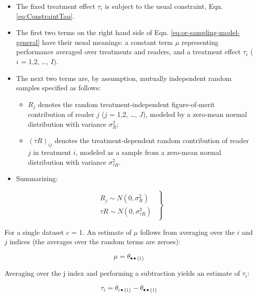 \documentclass[
]{book}
\providecommand{\tightlist}{%
  \setlength{\itemsep}{0pt}\setlength{\parskip}{0pt}}
\begin{document}
\begin{itemize}
\item
  The fixed treatment effect \(\tau_i\) is subject to the usual constraint, Eqn. \eqref{eq:ConstraintTau}.
\item
  The first two terms on the right hand side of Eqn. \eqref{eq:or-sampling-model-general} have their usual meanings: a constant term \(\mu\) representing performance averaged over treatments and readers, and a treatment effect \(\tau_i\) (\(i\) = 1,2, \ldots, \(I\)).
\item
  The next two terms are, by assumption, mutually independent random samples specified as follows:

  \begin{itemize}
  \tightlist
  \item
    \(R_j\) denotes the random treatment-independent figure-of-merit contribution of reader \(j\) (\(j\) = 1,2, \ldots, \(J\)), modeled by a zero-mean normal distribution with variance \(\sigma_R^2\);
  \item
    \((\tau R)_{ij}\) denotes the treatment-dependent random contribution of reader \(j\) in treatment \(i\), modeled as a sample from a zero-mean normal distribution with variance \(\sigma_{\tau R}^2\).
  \end{itemize}
\item
  Summarizing:
\end{itemize}

\begin{equation}
\left.
\begin{aligned}
\begin{matrix}
R_j \sim N(0,\sigma_R^2)\\ 
{\tau R} \sim N(0,\sigma_{\tau R}^2)
\end{matrix}
\end{aligned}
\right \}
\label{eq:ORVariances}
\end{equation}

For a single dataset \(c\) = 1. An estimate of \(\mu\) follows from averaging over the \(i\) and \(j\) indices (the averages over the random terms are zeroes):

\begin{equation}
\mu = \theta_{\bullet \bullet \{1\}}
\label{eq:ORmuEstimate}
\end{equation}

Averaging over the j index and performing a subtraction yields an estimate of \(\tau_i\):

\begin{equation}
\tau_i = \theta_{i \bullet \{1\}} - \theta_{\bullet \bullet \{1\}}
\label{eq:ORtauEstimate}
\end{equation}
\end{document}
